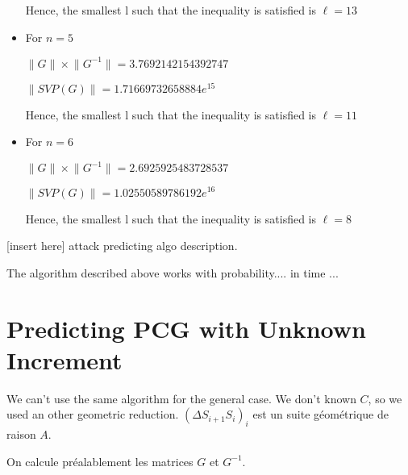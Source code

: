 \documentclass[preprint,svgnames]{iacrtrans}
\begin{document}
\begin{itemize}
	Hence, the smallest l such that the inequality is satisfied is \(\ell = 13\) %
	
	\item For \(n=5\)
	
	\(\lVert G \rVert \times \lVert G^{-1} \rVert = 3.7692142154392747\)
	
	\(\lVert SVP(G) \rVert = 1.71669732658884e^{15}\)
	
	Hence, the smallest l such that the inequality is satisfied is \(\ell = 11\)  %
	
	\item For \(n=6\)
	
	\(\lVert G \rVert \times \lVert G^{-1} \rVert = 2.6925925483728537\)
	
	\(\lVert SVP(G) \rVert =1.02550589786192e^{16}\)
	
	Hence, the smallest l such that the inequality is satisfied is \(\ell = 8\) %
\end{itemize}

[insert here] attack predicting algo description.

\begin{theorem}
  The algorithm described above works with probability.... in time ...
\end{theorem}

\section{Predicting PCG with Unknown Increment}
We can't use the same algorithm for the general case. We don't known $C$, so we used an other geometric reduction.
$(\Delta S_{i+1}S_i)_i$ est un suite géométrique de raison $A$.

On calcule préalablement les matrices $G$ et $G^{-1}$.
\end{document}
